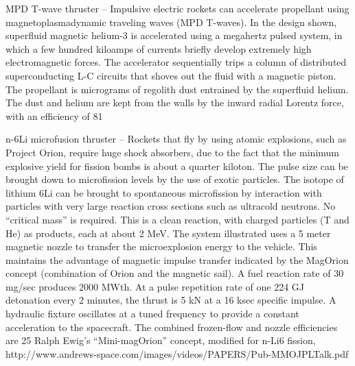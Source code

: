 \documentclass[a4paper]{book}
\begin{document}
MPD T-wave thruster – Impulsive electric rockets can accelerate propellant using magnetoplasmadynamic traveling waves (MPD T-waves).  In the design shown, superfluid magnetic helium-3 is accelerated using a megahertz pulsed system, in which a few hundred kiloamps of currents briefly develop extremely high electromagnetic forces. The accelerator sequentially trips a column of distributed superconducting L-C circuits that shoves out the fluid with a magnetic piston.  The propellant is micrograms of regolith dust entrained by the superfluid helium. The dust and helium are kept from the walls by the inward radial Lorentz force, with an efficiency of 81%
 
n-6Li microfusion thruster – Rockets that fly by using atomic explosions, such as Project Orion, require huge shock absorbers, due to the fact that the minimum explosive yield for fission bombs is about a quarter kiloton.  The pulse size can be brought down to microfission levels by the use of exotic particles. The isotope of lithium 6Li can be brought to spontaneous microfission by interaction with particles with very large reaction cross sections such as ultracold neutrons. No “critical mass” is required. This is a clean reaction, with charged particles (T and He) as products, each at about 2 MeV.  The system illustrated uses a 5 meter magnetic nozzle to transfer the microexplosion energy to the vehicle.  This maintains the advantage of magnetic impulse transfer indicated by the MagOrion concept (combination of Orion and the magnetic sail). A fuel reaction rate of 30 mg/sec produces 2000 MWth.  At a pulse repetition rate of one 224 GJ detonation every 2 minutes, the thrust is 5 kN at a 16 ksec specific impulse.  A hydraulic fixture oscillates at a tuned frequency to provide a constant acceleration to the spacecraft. The combined frozen-flow and nozzle efficiencies are 25%
Ralph Ewig’s “Mini-magOrion” concept, modified for n-Li6 fission, http://www.andrews-space.com/images/videos/PAPERS/Pub-MMOJPLTalk.pdf
 
\end{document}
